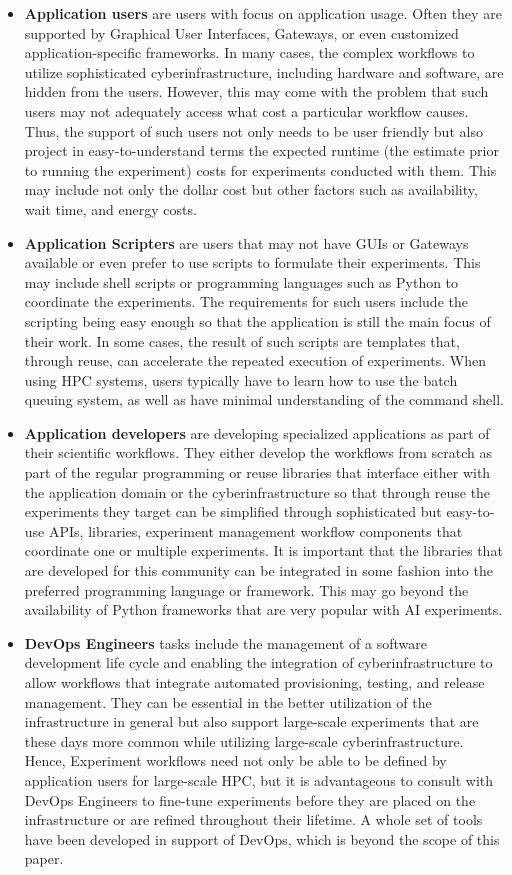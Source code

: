 \documentclass[utf8]{FrontiersinVancouver} %
\begin{document}
\begin{itemize}
    \item {\bf Application users} are users with focus on application usage. Often they are supported by Graphical User Interfaces, Gateways, or even customized application-specific frameworks. In many cases, the complex workflows to utilize sophisticated cyberinfrastructure, including hardware and software, are hidden from the users. However, this may come with the problem that such users may not adequately access what cost a particular workflow causes. Thus, the support of such users not only needs to be user friendly but also project in easy-to-understand terms the expected runtime (the estimate prior to running the experiment) costs for experiments conducted with them. This may include not only the dollar cost but other factors such as availability, wait time, and energy costs.
    \item {\bf Application Scripters} are users that may not have GUIs or Gateways available or even prefer to use scripts to formulate their experiments. This may include shell scripts or programming languages such as Python to coordinate the experiments. The requirements for such users include the scripting being easy enough so that the application is still the main focus of their work. In some cases, the result of such scripts are templates that, through reuse, can accelerate the repeated execution of experiments. When using HPC systems, users typically have to learn how to use the batch queuing system, as well as have minimal understanding of the command shell. 
    \item {\bf Application developers} are developing specialized applications as part of their scientific workflows. They either develop the workflows from scratch as part of the regular programming or reuse libraries that interface either with the application domain or the cyberinfrastructure so that through reuse the experiments they target can be simplified through sophisticated but easy-to-use APIs, libraries, experiment management workflow components that coordinate one or multiple experiments. It is important that the libraries that are developed for this community can be integrated in some fashion into the preferred programming language or framework. This may go beyond the availability of Python frameworks that are very popular with AI experiments. 
    \item {\bf DevOps Engineers} tasks include the management of a software development life cycle and enabling the integration of cyberinfrastructure to allow workflows that integrate automated provisioning, testing, and release management. They can be essential in the better utilization of the infrastructure in general but also support large-scale experiments that are these days more common while utilizing large-scale cyberinfrastructure. Hence, Experiment workflows need not only be able to be defined by application users for large-scale HPC, but it is advantageous to consult with DevOps Engineers to fine-tune experiments before they are placed on the infrastructure or are refined throughout their lifetime. A whole set of tools have been developed in support of DevOps, which is beyond the scope of this paper.

\end{itemize}
\end{document}
